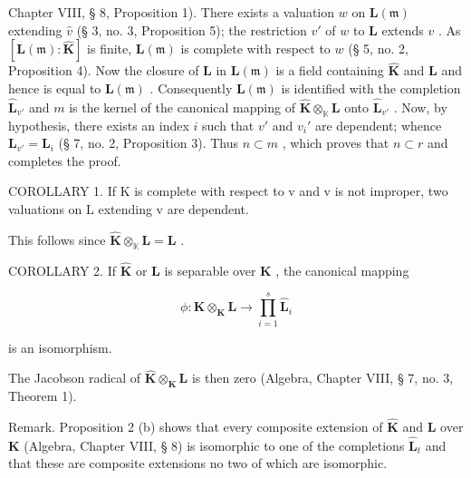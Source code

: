 Chapter VIII, § 8, Proposition 1). There exists a valuation \(w\) on \(\mathbf{L}(\mathfrak{m})\) extending \(\hat{v}\) (§ 3, no. 3, Proposition 5); the restriction \(v'\) of \(w\) to \(\mathbf{L}\) extends \(v\) . As \([\mathbf{L}(\mathfrak{m}): \hat{\mathbf{K}}]\) is finite, \(\mathbf{L}(\mathfrak{m})\) is complete with respect to \(w\) (§ 5, no. 2, Proposition 4). Now the closure of \(\mathbf{L}\) in \(\mathbf{L}(\mathfrak{m})\) is a field containing \(\hat{\mathbf{K}}\) and \(\mathbf{L}\) and hence is equal to \(\mathbf{L}(\mathfrak{m})\) . Consequently \(\mathbf{L}(\mathfrak{m})\) is identified with the completion \(\hat{\mathbf{L}}_{v'}\) and \(m\) is the kernel of the canonical mapping of \(\hat{\mathbf{K}} \otimes_{\mathbb{K}} \mathbf{L}\) onto \(\hat{\mathbf{L}}_{v'}\) . Now, by hypothesis, there exists an index \(i\) such that \(v'\) and \(v_i'\) are dependent; whence \(\mathbf{L}_{v'} = \mathbf{L}_i\) (§ 7, no. 2, Proposition 3). Thus \(n \subset m\) , which proves that \(n \subset r\) and completes the proof.

COROLLARY 1. If K is complete with respect to v and v is not improper, two valuations on L extending v are dependent.

This follows since \(\hat{\mathbf{K}}\otimes_{\mathbb{K}}\mathbf{L} = \mathbf{L}\) .

COROLLARY 2. If \(\hat{\mathbf{K}}\) or \(\mathbf{L}\) is separable over \(\mathbf{K}\) , the canonical mapping

\[
\phi : \hat {\mathbf {K}} \otimes_ {\mathbf {K}} \mathbf {L} \rightarrow \prod_ {i = 1} ^ {s} \hat {\mathbf {L}} _ {i}
\]

is an isomorphism.

The Jacobson radical of \(\hat{\mathbf{K}}\otimes_{\mathbf{K}}\mathbf{L}\) is then zero (Algebra, Chapter VIII, § 7, no. 3, Theorem 1).

Remark. Proposition 2 (b) shows that every composite extension of \(\hat{\mathbf{K}}\) and \(\mathbf{L}\) over \(\mathbf{K}\) (Algebra, Chapter VIII, § 8) is isomorphic to one of the completions \(\hat{\mathbf{L}}_t\) and that these are composite extensions no two of which are isomorphic.
\relax{}
